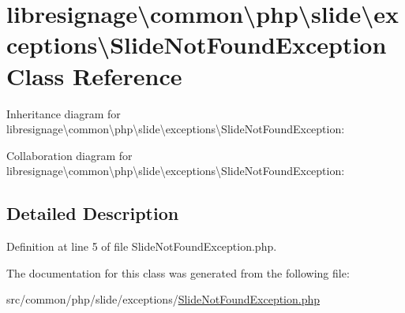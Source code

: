 \hypertarget{classlibresignage_1_1common_1_1php_1_1slide_1_1exceptions_1_1SlideNotFoundException}{}\section{libresignage\textbackslash{}common\textbackslash{}php\textbackslash{}slide\textbackslash{}exceptions\textbackslash{}Slide\+Not\+Found\+Exception Class Reference}
\label{classlibresignage_1_1common_1_1php_1_1slide_1_1exceptions_1_1SlideNotFoundException}


Inheritance diagram for libresignage\textbackslash{}common\textbackslash{}php\textbackslash{}slide\textbackslash{}exceptions\textbackslash{}Slide\+Not\+Found\+Exception\+:


Collaboration diagram for libresignage\textbackslash{}common\textbackslash{}php\textbackslash{}slide\textbackslash{}exceptions\textbackslash{}Slide\+Not\+Found\+Exception\+:


\subsection{Detailed Description}


Definition at line 5 of file Slide\+Not\+Found\+Exception.\+php.



The documentation for this class was generated from the following file\+:\begin{DoxyCompactItemize}
\item 
src/common/php/slide/exceptions/\hyperlink{SlideNotFoundException_8php}{Slide\+Not\+Found\+Exception.\+php}\end{DoxyCompactItemize}
